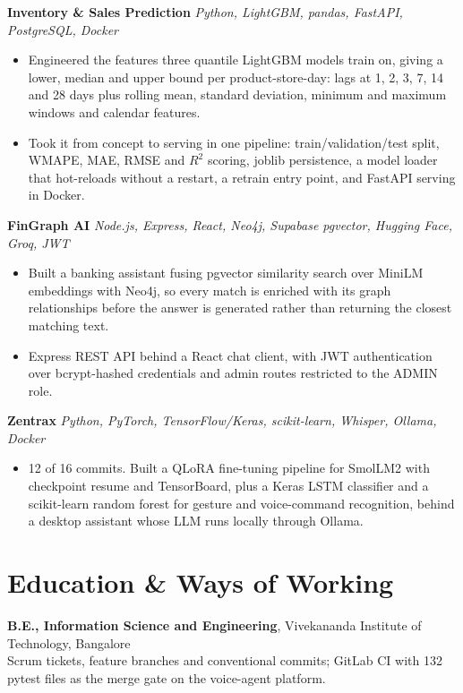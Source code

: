 \documentclass[10pt,a4paper]{article}
\begin{document}
\vspace{1pt}
\textbf{Inventory \& Sales Prediction} \textit{Python, LightGBM, pandas, FastAPI, PostgreSQL, Docker}
\begin{itemize}
  \item Engineered the features three quantile LightGBM models train on, giving a lower, median and
        upper bound per product-store-day: lags at 1, 2, 3, 7, 14 and 28 days plus rolling mean,
        standard deviation, minimum and maximum windows and calendar features.
  \item Took it from concept to serving in one pipeline: train/validation/test split, WMAPE, MAE,
        RMSE and $R^2$ scoring, joblib persistence, a model loader that hot-reloads without a
        restart, a retrain entry point, and FastAPI serving in Docker.
\end{itemize}

\vspace{1pt}
\textbf{FinGraph AI} \textit{Node.js, Express, React, Neo4j, Supabase pgvector, Hugging Face, Groq, JWT}
\begin{itemize}
  \item Built a banking assistant fusing pgvector similarity search over MiniLM embeddings with
        Neo4j, so every match is enriched with its graph relationships before the answer is
        generated rather than returning the closest matching text.
  \item Express REST API behind a React chat client, with JWT authentication over bcrypt-hashed
        credentials and admin routes restricted to the ADMIN role.
\end{itemize}

\vspace{1pt}
\textbf{Zentrax} \textit{Python, PyTorch, TensorFlow/Keras, scikit-learn, Whisper, Ollama, Docker}
\begin{itemize}
  \item 12 of 16 commits. Built a QLoRA fine-tuning pipeline for SmolLM2 with checkpoint resume and
        TensorBoard, plus a Keras LSTM classifier and a scikit-learn random forest for gesture and
        voice-command recognition, behind a desktop assistant whose LLM runs locally through Ollama.
\end{itemize}

\section{Education \& Ways of Working}
\textbf{B.E., Information Science and Engineering}, Vivekananda Institute of Technology, Bangalore\\
Scrum tickets, feature branches and conventional commits; GitLab CI with 132 pytest files as the
merge gate on the voice-agent platform.
\end{document}
